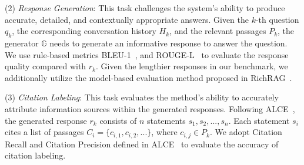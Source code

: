 \documentclass[11pt]{article}
\begin{document}
(2) \textit{Response Generation}: This task challenges the system's ability to produce accurate, detailed, and contextually appropriate answers.
Given the $k$-th question $q_{k}$, the corresponding conversation history $ H_{k} $, and the relevant passages  $P_{k}$, the generator $\mathbb{G} $ needs to generate an informative response to answer the question. We use rule-based metrics BLEU-1~\cite{bleu}, and ROUGE-L~\cite{lin2004rouge} to evaluate the response quality compared with $r_{k}$. Given the lengthier responses in our benchmark, we additionally utilize the model-based evaluation method proposed in RichRAG~\citep{wang_richrag}.



(3) \textit{Citation Labeling}: This task evaluates the method's ability to accurately attribute information sources within the generated responses.
Following ALCE~\citep{gao_alce_emnlp23}, the generated response $r_{k}$ consists of $n$ statements $s_1, s_2,...,s_n$. Each statement $s_i$ cites a list of passages $C_i = \{ c_{i,1},c_{i,2},...\} $, where $c_{i,j} \in P_k$. We adopt Citation Recall and Citation Precision defined in ALCE~\citep{gao_alce_emnlp23} to evaluate the accuracy of citation labeling.



\end{document}
